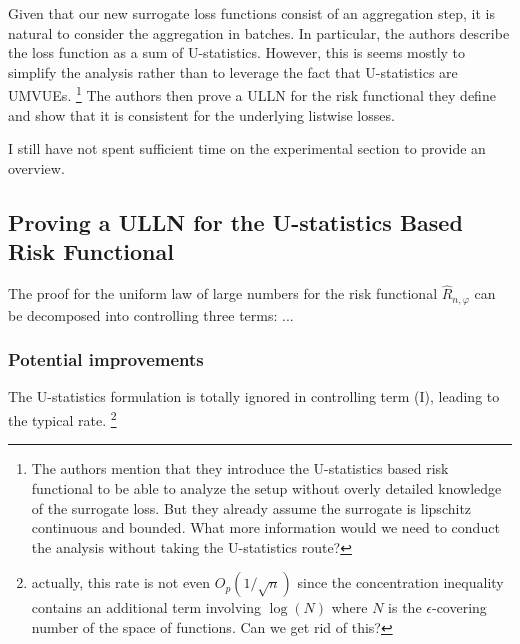 \documentclass{article}
\begin{document}
Given that our new surrogate loss functions consist of an aggregation
step, it is natural to consider the aggregation in batches. In
particular, the authors describe the loss function as a sum of
U-statistics. However, this is seems mostly to simplify the analysis
rather than to leverage the fact that U-statistics are UMVUEs.
\footnote{The authors mention that they introduce the U-statistics
  based risk functional to be able to analyze the setup without overly
  detailed knowledge of the surrogate loss. But they already assume
  the surrogate is lipschitz continuous and bounded. What more
  information would we need to conduct the analysis without taking the
  U-statistics route?}
The authors then prove a ULLN for the risk
functional they define and show that it is consistent for the
underlying listwise losses.

I still have not spent sufficient time on the experimental section to provide an overview.

\subsection{Proving a ULLN for the U-statistics Based Risk Functional}

The proof for the uniform law of large numbers for the risk functional \(\hat{R}_{n, \varphi}\) can be decomposed into controlling three terms:
...

\subsubsection{Potential improvements}
The U-statistics formulation is totally ignored in controlling term (I), leading to the typical rate.
\footnote{actually, this rate is not even \(O_p(1/\sqrt n)\) since the concentration inequality contains an additional term involving \(\log(N)\) where \(N\) is the \(\epsilon\)-covering number of the space of functions. Can we get rid of this?}
\end{document}
